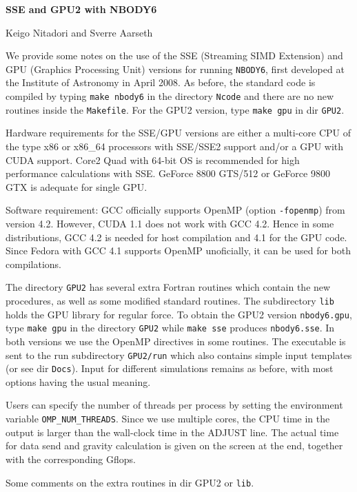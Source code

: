 \documentclass[12pt]{article}
\begin{document}
\centerline {\Large {\bf {SSE and GPU2 with NBODY6}}}
\bigskip
\bigskip
\centerline {\Large {Keigo Nitadori and Sverre Aarseth~~~}}
\bigskip
\medskip
\bigskip
We provide some notes on the use of the SSE (Streaming SIMD Extension)
and GPU (Graphics Processing Unit) versions for running
{\tt NBODY6}, first developed at the Institute of Astronomy in April 2008. 
As before, the standard code is compiled by typing {\tt make nbody6} in the
directory {\tt Ncode} and there are no new routines inside the {\tt Makefile}.
For the GPU2 version, type {\tt make gpu} in dir {\tt GPU2}.
\medskip

Hardware requirements for the SSE/GPU versions are either a multi-core
CPU of the type x86 or x86\_64 processors with SSE/SSE2 support and/or
a GPU with CUDA support. Core2 Quad with 64-bit OS is recommended for high
performance calculations with SSE.
GeForce 8800 GTS/512 or GeForce 9800 GTX is adequate for single GPU.
\medskip

Software requirement: GCC officially supports OpenMP (option {\tt -fopenmp}) from
version 4.2.
However, CUDA 1.1 does not work with GCC 4.2.
Hence in some distributions, GCC 4.2 is needed for host compilation and
4.1 for the GPU code.
Since Fedora with GCC 4.1 supports OpenMP unoficially, it can be used
for both compilations.

\medskip

The directory {\tt GPU2} has several extra Fortran routines which contain the
new procedures, as well as some modified standard routines.
The subdirectory {\tt lib} holds the GPU library for regular force.
To obtain the GPU2 version {\tt nbody6.gpu}, type {\tt make gpu} in the 
directory {\tt GPU2} while {\tt make sse} produces {\tt nbody6.sse}.
In both versions we use the OpenMP directives in some routines.
The executable is sent to the run subdirectory {\tt GPU2/run} which
also contains simple input templates (or see dir {\tt Docs}).
Input for different simulations remains as before, with most options
having the usual meaning.
\medskip

Users can specify the number of threads per process by setting the
environment variable {\tt OMP\_NUM\_THREADS}.
Since we use multiple cores, the CPU time in the output is larger
than the wall-clock time in the ADJUST line. The actual time for data
send and gravity calculation is given on the screen at the end, together
with the corresponding Gflops.

\medskip
Some comments on the extra routines in dir GPU2 or {\tt lib}.
\end{document}
